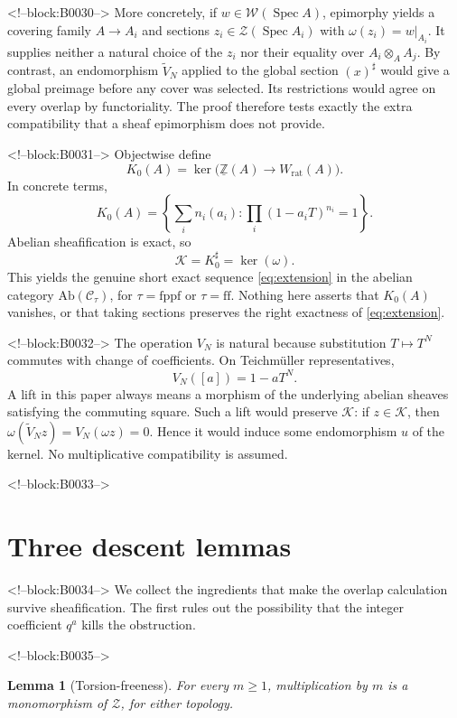 \documentclass[11pt]{article}
\newtheorem{lemma}[theorem]{Lemma}
\theoremstyle{definition}
\newcommand{\Spec}{\operatorname{Spec}}
\newcommand{\Wrat}{W_{\mathrm{rat}}}
\newcommand{\Zpre}{\underline{\mathbb Z}}
\newcommand{\Zsh}{\mathcal Z}
\newcommand{\Wsh}{\mathcal W}
\newcommand{\Ksh}{\mathcal K}
\newcommand{\sh}{\sharp}
\newcommand{\ff}{\mathrm{ff}}
\newcommand{\fppf}{\mathrm{fppf}}
\begin{document}
<!--block:B0030-->
More concretely, if \(w\in\Wsh(\Spec A)\), epimorphy yields a covering
family \(A\to A_i\) and sections \(z_i\in\Zsh(\Spec A_i)\) with
\(\omega(z_i)=w|_{A_i}\).  It supplies neither a natural choice of the
\(z_i\) nor their equality over \(A_i\otimes_A A_j\).  By contrast, an
endomorphism \(\widetilde V_N\) applied to the global section
\((x)^\sh\) would give a global preimage before any cover was selected.
Its restrictions would agree on every overlap by functoriality.  The proof
therefore tests exactly the extra compatibility that a sheaf epimorphism
does not provide.

<!--block:B0031-->
Objectwise define
\[
 K_0(A)=\ker\bigl(\Zpre(A)\longrightarrow\Wrat(A)\bigr).
\]
In concrete terms,
\[
 K_0(A)=
 \left\{\sum_i n_i(a_i):
   \prod_i(1-a_iT)^{n_i}=1\right\}.
 \tag{2.2}\label{eq:kernel}
\]
Abelian sheafification is exact, so
\[
 \Ksh=K_0^\sh=\ker(\omega).
\]
This yields the genuine short exact sequence \eqref{eq:extension} in the
abelian category \(\mathrm{Ab}(\mathscr C_\tau)\), for
\(\tau=\fppf\) or \(\tau=\ff\).  Nothing here asserts that
\(K_0(A)\) vanishes, or that taking sections preserves the right exactness
of \eqref{eq:extension}.

<!--block:B0032-->
The operation \(V_N\) is natural because substitution \(T\mapsto T^N\)
commutes with change of coefficients.  On Teichm\"uller representatives,
\[
 V_N([a])=1-aT^N.
 \tag{2.3}\label{eq:versch}
\]
A lift in this paper always means a morphism of the underlying abelian
sheaves satisfying the commuting square.  Such a lift would preserve
\(\Ksh\): if \(z\in\Ksh\), then
\(\omega(\widetilde V_Nz)=V_N(\omega z)=0\).  Hence it would induce some
endomorphism \(u\) of the kernel.  No multiplicative compatibility is
assumed.

<!--block:B0033-->
\section{Three descent lemmas}\label{sec:lemmas}

<!--block:B0034-->
We collect the ingredients that make the overlap calculation survive
sheafification.  The first rules out the possibility that the integer
coefficient \(q^a\) kills the obstruction.

<!--block:B0035-->
\begin{lemma}[Torsion-freeness]\label{lem:torsionfree}
For every \(m\geq1\), multiplication by \(m\) is a monomorphism of
\(\Zsh\), for either topology.
\end{lemma}
\end{document}
